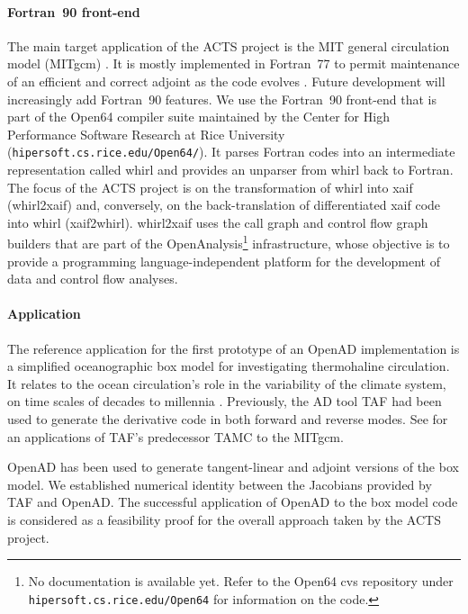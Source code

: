 \documentclass{article}
\begin{document}
\paragraph{Fortran~90 front-end} 
The main target application of the ACTS project is the MIT general circulation
model (MITgcm) \cite{mars-eta:97b,mars-eta:97a}. 
It is mostly implemented in Fortran~77 to permit maintenance of an efficient
and correct adjoint as the code evolves \cite{HHG02}. Future development will
increasingly add Fortran~90 features. We use the Fortran~90 
front-end that is part of the Open64 compiler suite 
maintained by the Center for High Performance Software
Research at Rice University 
({\tt hipersoft.cs.rice.edu/Open64/}). It parses
Fortran codes into an intermediate representation called whirl and
provides an unparser from whirl back to Fortran. 
The focus of the ACTS project is on the
transformation of whirl into xaif (whirl2xaif) and, conversely, on the
back-translation of differentiated xaif code into whirl (xaif2whirl). 
whirl2xaif uses the call graph and control flow graph builders that are part 
of the OpenAnalysis\footnote{No documentation is available yet. 
Refer to the Open64 cvs repository under 
{\tt hipersoft.cs.rice.edu/Open64} for information on the code.} 
infrastructure, whose objective is to provide a programming
language-independent platform for the development of data and control flow 
analyses. 

\paragraph{Application}

The reference application for the first prototype of an OpenAD implementation
is a simplified oceanographic box model for investigating
thermohaline circulation. It relates to the
ocean circulation's role in the variability of the climate system,
on time scales of decades to millennia \cite{tzi-ioa:02}.
Previously, the AD tool TAF \cite{GiKa02} 
had been used to generate the derivative
code in both forward and reverse modes.
See \cite{maro-eta:99} for an applications of
TAF's predecessor TAMC to the MITgcm.

OpenAD has been used to generate tangent-linear and 
adjoint versions of the box model. We established numerical identity between
the Jacobians provided by TAF and OpenAD.
The successful 
application of OpenAD to the box model code is considered as a feasibility 
proof for the overall approach taken by the ACTS project.  
\end{document}
